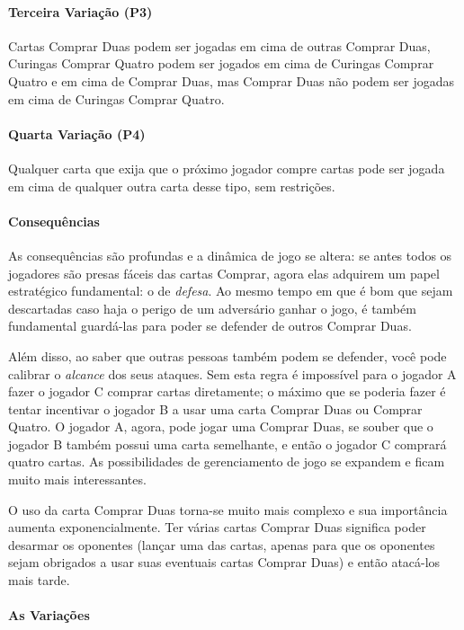 \paragraph{Terceira Variação (P3)} Cartas Comprar Duas podem ser jogadas em cima de outras Comprar Duas, Curingas Comprar Quatro podem ser jogados em cima de Curingas Comprar Quatro e em cima de Comprar Duas, mas Comprar Duas não podem ser jogadas em cima de Curingas Comprar Quatro.

\paragraph{Quarta Variação (P4)} Qualquer carta que exija que o próximo jogador compre cartas pode ser jogada em cima de qualquer outra carta desse tipo, sem restrições.

\paragraph{Consequências}

As consequências são profundas e a dinâmica de jogo se altera: se antes todos os jogadores são presas fáceis das cartas Comprar, agora elas adquirem um papel estratégico fundamental: o de \emph{defesa}. Ao mesmo tempo em que é bom que sejam descartadas caso haja o perigo de um adversário ganhar o jogo, é também fundamental guardá-las para poder se defender de outros Comprar Duas.

Além disso, ao saber que outras pessoas também podem se defender, você pode calibrar o \emph{alcance} dos seus ataques. Sem esta regra é impossível para o jogador A fazer o jogador C comprar cartas diretamente; o máximo que se poderia fazer é tentar incentivar o jogador B a usar uma carta Comprar Duas ou Comprar Quatro. O jogador A, agora, pode jogar uma Comprar Duas, se souber que o jogador B também possui uma carta semelhante, e então o jogador C comprará quatro cartas. As possibilidades de gerenciamento de jogo se expandem e ficam muito mais interessantes.

O uso da carta Comprar Duas torna-se muito mais complexo e sua importância aumenta exponencialmente. Ter várias cartas Comprar Duas significa poder desarmar os oponentes (lançar uma das cartas, apenas para que os oponentes sejam obrigados a usar suas eventuais cartas Comprar Duas) e então atacá-los mais tarde.

\paragraph{As Variações}

